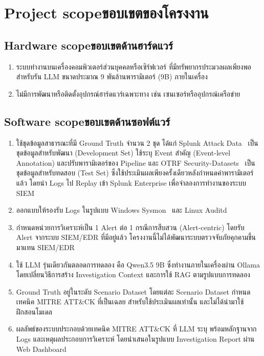 \section{\ifenglish Project scope\else ขอบเขตของโครงงาน\fi}

\subsection{\ifenglish Hardware scope\else ขอบเขตด้านฮาร์ดแวร์\fi}
\begin{enumerate}
    \item ระบบทำงานบนเครื่องคอมพิวเตอร์ส่วนบุคคลหรือเซิร์ฟเวอร์
          ที่มีทรัพยากรประมวลผลเพียงพอสำหรับรัน LLM ขนาดประมาณ
          9 พันล้านพารามิเตอร์ (9B) ภายในเครื่อง
    \item ไม่มีการพัฒนาหรือติดตั้งอุปกรณ์ฮาร์ดแวร์เฉพาะทาง
          เช่น เซนเซอร์หรืออุปกรณ์เครือข่าย
\end{enumerate}

\subsection{\ifenglish Software scope\else ขอบเขตด้านซอฟต์แวร์\fi}
\begin{enumerate}
    \item ใช้ชุดข้อมูลสาธารณะที่มี Ground Truth จำนวน 2 ชุด ได้แก่
          Splunk Attack Data~\cite{splunk-attack-data} เป็นชุดข้อมูลสำหรับพัฒนา
          (Development Set) ใช้ระบุ Event สำคัญ (Event-level Annotation)
          และปรับพารามิเตอร์ของ Pipeline และ
          OTRF Security-Datasets~\cite{otrf-security-datasets} เป็นชุดข้อมูลสำหรับทดสอบ
          (Test Set) ซึ่งใช้ประเมินผลเพียงครั้งเดียวหลังกำหนดค่าพารามิเตอร์แล้ว
          โดยนำ Logs ไป Replay เข้า Splunk Enterprise เพื่อจำลองการทำงานของระบบ SIEM

    \item ออกแบบให้รองรับ Logs ในรูปแบบ Windows Sysmon~\cite{sysmon}
          และ Linux Auditd~\cite{auditd}

    \item กำหนดหน่วยการวิเคราะห์เป็น 1 Alert ต่อ 1 กรณีการสืบสวน
          (Alert-centric) โดยรับ Alert จากระบบ SIEM/EDR ที่มีอยู่แล้ว
          โครงงานนี้ไม่ได้พัฒนาระบบตรวจจับภัยคุกคามขึ้นมาแทน SIEM/EDR

    \item ใช้ LLM รุ่นเดียวกันตลอดการทดลอง คือ Qwen3.5 9B
          ซึ่งทำงานภายในเครื่องผ่าน Ollama โดยเปลี่ยนวิธีการสร้าง
          Investigation Context และการใช้ RAG ตามรูปแบบการทดลอง

    \item Ground Truth อยู่ในระดับ Scenario Dataset โดยแต่ละ
          Scenario Dataset กำหนดเทคนิค MITRE ATT\&CK ที่เป็นเฉลย
          สำหรับใช้ประเมินผลเท่านั้น และไม่ได้นำมาใช้ฝึกสอนโมเดล

    \item ผลลัพธ์ของระบบประกอบด้วยเทคนิค MITRE ATT\&CK ที่ LLM
          ระบุ พร้อมหลักฐานจาก Logs และเหตุผลประกอบการวิเคราะห์
          โดยนำเสนอในรูปแบบ Investigation Report ผ่าน Web Dashboard
\end{enumerate}


